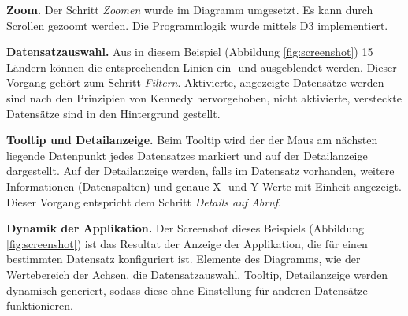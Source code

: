\textbf{Zoom.} Der Schritt \textit{Zoomen} wurde im Diagramm umgesetzt. Es kann durch Scrollen gezoomt werden. Die Programmlogik wurde mittels D3 implementiert.

\textbf{Datensatzauswahl.} Aus in diesem Beispiel (Abbildung \ref{fig:screenshot}) 15 Ländern können die entsprechenden Linien ein- und ausgeblendet werden. Dieser Vorgang gehört zum Schritt \textit{Filtern}. Aktivierte, angezeigte Datensätze werden sind nach den Prinzipien von Kennedy hervorgehoben, nicht aktivierte, versteckte Datensätze sind in den Hintergrund gestellt.

\textbf{Tooltip und Detailanzeige.} Beim Tooltip wird der der Maus am nächsten liegende Datenpunkt jedes Datensatzes markiert und auf der Detailanzeige dargestellt. Auf der Detailanzeige werden, falls im Datensatz vorhanden, weitere Informationen (Datenspalten) und genaue X- und Y-Werte mit Einheit angezeigt. Dieser Vorgang entspricht dem Schritt \textit{Details auf Abruf}.

\textbf{Dynamik der Applikation.} Der Screenshot dieses Beispiels (Abbildung \ref{fig:screenshot}) ist das Resultat der Anzeige der Applikation, die für einen bestimmten Datensatz konfiguriert ist. Elemente des Diagramms, wie der Wertebereich der Achsen, die Datensatzauswahl, Tooltip, Detailanzeige werden dynamisch generiert, sodass diese ohne Einstellung für anderen Datensätze funktionieren.

